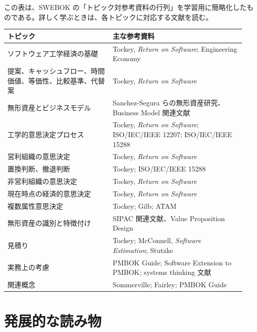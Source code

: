 \documentclass[a4paper,11pt]{article}
\begin{document}
この表は、SWEBOK の「トピック対参考資料の行列」を学習用に簡略化したものである。詳しく学ぶときは、各トピックに対応する文献を読む。

\begin{longtable}{L{0.42\linewidth} L{0.53\linewidth}}
\toprule
\textbf{トピック} & \textbf{主な参考資料} \\
\midrule
ソフトウェア工学経済の基礎 & Tockey, \textit{Return on Software}; Engineering Economy \\
提案、キャッシュフロー、時間価値、等価性、比較基準、代替案 & Tockey, \textit{Return on Software} \\
無形資産とビジネスモデル & Sanchez-Segura らの無形資産研究、Business Model 関連文献 \\
工学的意思決定プロセス & Tockey, \textit{Return on Software}; ISO/IEC/IEEE 12207; ISO/IEC/IEEE 15288 \\
営利組織の意思決定 & Tockey, \textit{Return on Software} \\
置換判断、撤退判断 & Tockey; ISO/IEC/IEEE 15288 \\
非営利組織の意思決定 & Tockey, \textit{Return on Software} \\
現在時点の経済的意思決定 & Tockey, \textit{Return on Software} \\
複数属性意思決定 & Tockey; Gilb; ATAM \\
無形資産の識別と特徴付け & SIPAC 関連文献、Value Proposition Design \\
見積り & Tockey; McConnell, \textit{Software Estimation}; Stutzke \\
実務上の考慮 & PMBOK Guide; Software Extension to PMBOK; systems thinking 文献 \\
関連概念 & Sommerville; Fairley; PMBOK Guide \\
\bottomrule
\end{longtable}

\section{発展的な読み物}
\end{document}
